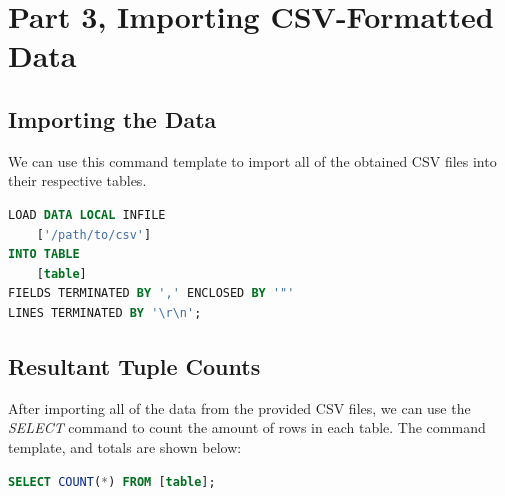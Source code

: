 \documentclass{article}
\begin{document}
\section{Part 3, Importing CSV-Formatted Data}

\subsection{Importing the Data}

We can use this command template to import all of the obtained CSV files into their respective tables.

\begin{lstlisting}[language=SQL,
    deletekeywords={IDENTITY},
    deletekeywords={[2]INT},
    morekeywords={clustered,load,data,infile,fields,terminated,enclosed,lines},
    framesep=8pt,
    xleftmargin=40pt,
    framexleftmargin=40pt,
    frame=tb,
    framerule=0pt ]
LOAD DATA LOCAL INFILE 
    ['/path/to/csv']
INTO TABLE
    [table] 
FIELDS TERMINATED BY ',' ENCLOSED BY '"'
LINES TERMINATED BY '\r\n';
\end{lstlisting}

\subsection{Resultant Tuple Counts}

After importing all of the data from the provided CSV files, we can use the \textit{SELECT} command to count the amount of rows in each table. The command template, and totals are shown below:

\begin{lstlisting}[language=SQL,
    deletekeywords={IDENTITY},
    deletekeywords={[2]INT},
    morekeywords={clustered},
    framesep=8pt,
    xleftmargin=40pt,
    framexleftmargin=40pt,
    frame=tb,
    framerule=0pt ]
SELECT COUNT(*) FROM [table];
\end{lstlisting}
\end{document}
